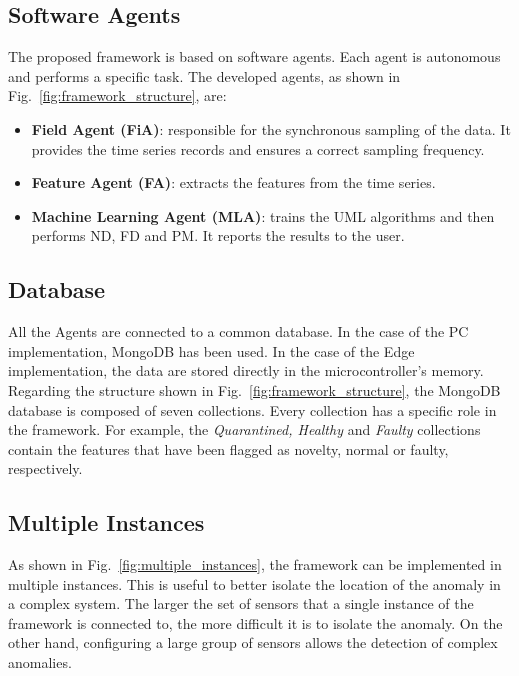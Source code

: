 \subsection{Software Agents}
The proposed framework is based on software agents. Each agent is autonomous and performs a specific task. The developed agents, as shown in Fig.~\ref{fig:framework_structure}, are:
\begin{itemize}
    \item \textbf{Field Agent (FiA)}: responsible for the synchronous sampling of the data. It provides the time series records and ensures a correct sampling frequency.
    \item \textbf{Feature Agent (FA)}: extracts the features from the time series.
    \item \textbf{Machine Learning Agent (MLA)}: trains the UML algorithms and then performs ND, FD and PM. It reports the results to the user.
\end{itemize}

\subsection{Database}
All the Agents are connected to a common database. In the case of the PC implementation, MongoDB has been used. In the case of the Edge implementation, the data are stored directly in the microcontroller's memory.
Regarding the structure shown in Fig.~\ref{fig:framework_structure}, the MongoDB database is composed of seven collections. Every collection has a specific role in the framework. For example, the \emph{Quarantined, Healthy} and \emph{Faulty} collections contain the features that have been flagged as novelty, normal or faulty, respectively.

\subsection{Multiple Instances}
As shown in Fig.~\ref{fig:multiple_instances}, the framework can be implemented in multiple instances. This is useful to better isolate the location of the anomaly in a complex system. The larger the set of sensors that a single instance of the framework is connected to, the more difficult it is to isolate the anomaly. On the other hand, configuring a large group of sensors allows the detection of complex anomalies.

